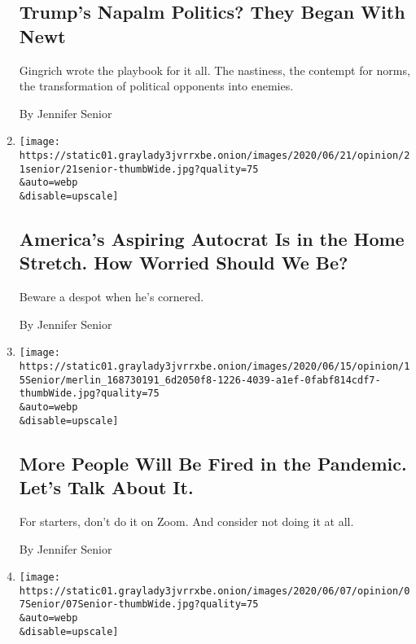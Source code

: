 \begin{enumerate}
  \hypertarget{trumps-napalm-politics-they-began-with-newt}{%
  \subsection{Trump's Napalm Politics? They Began With
  Newt}\label{trumps-napalm-politics-they-began-with-newt}}

  Gingrich wrote the playbook for it all. The nastiness, the contempt
  for norms, the transformation of political opponents into enemies.

  By Jennifer Senior
\item
  \href{/2020/06/21/opinion/trump-autocrat-barr.html}{}

  \texttt{[image: https://static01.graylady3jvrrxbe.onion/images/2020/06/21/opinion/21senior/21senior-thumbWide.jpg?quality=75\\\&auto=webp\\\&disable=upscale]}

  \hypertarget{americas-aspiring-autocrat-is-in-the-home-stretch-how-worried-should-we-be}{%
  \subsection{America's Aspiring Autocrat Is in the Home Stretch. How
  Worried Should We
  Be?}\label{americas-aspiring-autocrat-is-in-the-home-stretch-how-worried-should-we-be}}

  Beware a despot when he's cornered.

  By Jennifer Senior
\item
  \href{/2020/06/14/opinion/layoffs-coronavirus-economy.html}{}

  \texttt{[image: https://static01.graylady3jvrrxbe.onion/images/2020/06/15/opinion/15Senior/merlin\_168730191\_6d2050f8-1226-4039-a1ef-0fabf814cdf7-thumbWide.jpg?quality=75\\\&auto=webp\\\&disable=upscale]}

  \hypertarget{more-people-will-be-fired-in-the-pandemic-lets-talk-about-it}{%
  \subsection{More People Will Be Fired in the Pandemic. Let's Talk
  About
  It.}\label{more-people-will-be-fired-in-the-pandemic-lets-talk-about-it}}

  For starters, don't do it on Zoom. And consider not doing it at all.

  By Jennifer Senior
\item
  \href{/2020/06/07/opinion/trump-mattis-polls.html}{}

  \texttt{[image: https://static01.graylady3jvrrxbe.onion/images/2020/06/07/opinion/07Senior/07Senior-thumbWide.jpg?quality=75\\\&auto=webp\\\&disable=upscale]}


\end{enumerate}
